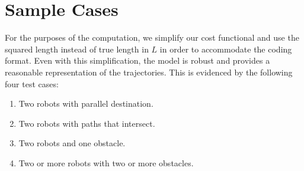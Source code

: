 \section{Sample Cases}


For the purposes of the computation, we simplify our cost functional and use the squared length instead of true length in \( L \) in order to accommodate the coding format. Even with this simplification, the model is robust and provides a reasonable representation of the trajectories. This is evidenced by the following four test cases: 

\begin{enumerate}
    \item Two robots with parallel destination.
    
    \item Two robots with paths that intersect.
    
    \item Two robots and one obstacle.
    
    \item Two or more robots with two or more obstacles.
    
\end{enumerate}

